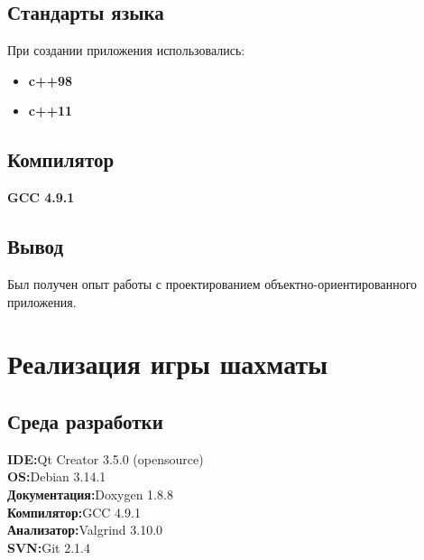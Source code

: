 \subsection*{Стандарты языка}
При создании приложения использовались:
\begin{itemize}
\item\textbf{c++98}\\
\item\textbf{c++11}\\
\end{itemize}

\subsection*{Компилятор}
\textbf{GCC 4.9.1}\\

\subsection*{Вывод}
Был получен опыт работы с проектированием объектно-ориентированного приложения. 

\section*{Реализация игры шахматы}

\subsection*{Среда разработки}

\noindent\textbf{IDE:}Qt Creator 3.5.0 (opensource)\\
\textbf{OS:}Debian 3.14.1\\
\textbf{Документация:}Doxygen 1.8.8\\
\textbf{Компилятор:}GCC 4.9.1\\
\textbf{Анализатор:}Valgrind 3.10.0\\
\textbf{SVN:}Git 2.1.4

